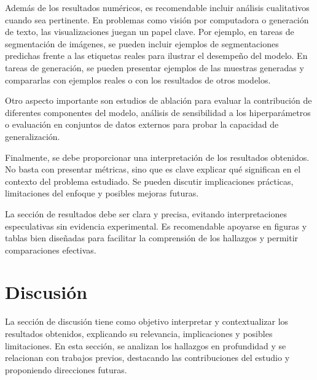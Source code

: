 \documentclass[letterpaper, 10 pt, conference]{ieeeconf}  %
\begin{document}
Además de los resultados numéricos, es recomendable incluir análisis cualitativos cuando sea pertinente. En problemas como visión por computadora o generación de texto, las visualizaciones juegan un papel clave. Por ejemplo, en tareas de segmentación de imágenes, se pueden incluir ejemplos de segmentaciones predichas frente a las etiquetas reales para ilustrar el desempeño del modelo. En tareas de generación, se pueden presentar ejemplos de las muestras generadas y compararlas con ejemplos reales o con los resultados de otros modelos.

Otro aspecto importante son estudios de ablación para evaluar la contribución de diferentes componentes del modelo, análisis de sensibilidad a los hiperparámetros o evaluación en conjuntos de datos externos para probar la capacidad de generalización.

Finalmente, se debe proporcionar una interpretación de los resultados obtenidos. No basta con presentar métricas, sino que es clave explicar qué significan en el contexto del problema estudiado. Se pueden discutir implicaciones prácticas, limitaciones del enfoque y posibles mejoras futuras.

La sección de resultados debe ser clara y precisa, evitando interpretaciones especulativas sin evidencia experimental. Es recomendable apoyarse en figuras y tablas bien diseñadas para facilitar la comprensión de los hallazgos y permitir comparaciones efectivas.

\begin{table}[]
\centering
\caption{Ejemplo de una matriz de confusión en la que se presentan los resultados de un modelo de clasificación de imágenes.}
\end{table}

\section{Discusión}

La sección de discusión tiene como objetivo interpretar y contextualizar los resultados obtenidos, explicando su relevancia, implicaciones y posibles limitaciones. En esta sección, se analizan los hallazgos en profundidad y se relacionan con trabajos previos, destacando las contribuciones del estudio y proponiendo direcciones futuras.
\end{document}
